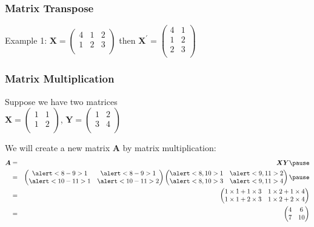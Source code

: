 \documentclass[handout]{beamer}
\numberwithin{equation}{section}
\begin{document}
\begin{frame}
\frametitle{Matrix Transpose}

Example 1:  $\boldsymbol{X} = \begin{pmatrix} 4 & 1 & 2 \\1 & 2  & 3 \\ \end{pmatrix} $ then 
$\boldsymbol{X}^{'} = \begin{pmatrix} 4 & 1 \\ 1 & 2 \\ 2 & 3 \\ \end{pmatrix} $ \\
\end{frame}



\begin{frame}
\frametitle{Matrix Multiplication}

Suppose we have two matrices \pause  \\
$\boldsymbol{X} = \begin{pmatrix} 1 & 1 \\ 1& 2 \\ \end{pmatrix} $, $\boldsymbol{Y} = \begin{pmatrix} 1 & 2 \\ 3 & 4 \\ \end{pmatrix} $ \pause 

We will create a new matrix $\boldsymbol{A}$ by matrix multiplication: \pause 
\begin{eqnarray} 
\boldsymbol{A} & = & \boldsymbol{X} \boldsymbol{Y} \nonumber  \pause \\
				& = & \begin{pmatrix} \alert<8-9>{1} & \alert<8-9>{1} \\ \alert<10-11>{1}& \alert<10-11>{2}\\ \end{pmatrix} \begin{pmatrix} \alert<8,10>{1} & \alert<9,11>{2} \\ \alert<8,10>{3} & \alert<9,11>{4} \\ \end{pmatrix}
\nonumber  \pause \\
     					& = & \begin{pmatrix} 
							1 \times 1 + 1 \times 3  & 1 \times 2 + 1 \times 4  \\
							1 \times 1  + 2\times 3  & 1 \times 2 + 2 \times 4   \\
							\end{pmatrix} \nonumber \\
					& = & \begin{pmatrix} 
							4 & 6 \\
							7& 10 \\
							\end{pmatrix}		
							\nonumber 
\end{eqnarray}							

\end{frame}
\end{document}
